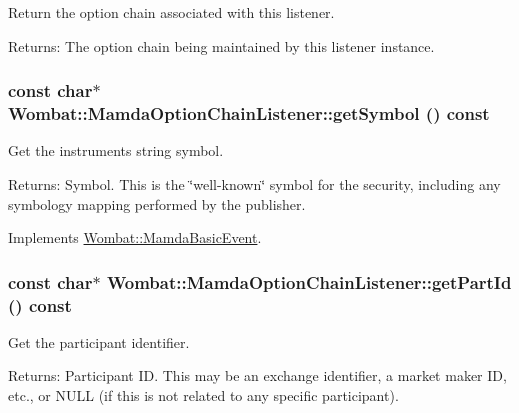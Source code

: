 Return the option chain associated with this listener. 

\begin{Desc}
\item[Returns:]The option chain being maintained by this listener instance. \end{Desc}
\hypertarget{classWombat_1_1MamdaOptionChainListener_74e03d49241666a1670a07e4187bf955}{
\subsubsection[getSymbol]{\setlength{\rightskip}{0pt plus 5cm}const char$\ast$ Wombat::Mamda\-Option\-Chain\-Listener::get\-Symbol () const}}
\label{classWombat_1_1MamdaOptionChainListener_74e03d49241666a1670a07e4187bf955}


Get the instruments string symbol. 

\begin{Desc}
\item[Returns:]Symbol. This is the \char`\"{}well-known\char`\"{} symbol for the security, including any symbology mapping performed by the publisher. \end{Desc}


Implements \hyperlink{classWombat_1_1MamdaBasicEvent_8783b136a1305d21c578ced8618c090b}{Wombat::Mamda\-Basic\-Event}.\hypertarget{classWombat_1_1MamdaOptionChainListener_742fc512426cd4b38cdddc67747ea269}{
\subsubsection[getPartId]{\setlength{\rightskip}{0pt plus 5cm}const char$\ast$ Wombat::Mamda\-Option\-Chain\-Listener::get\-Part\-Id () const}}
\label{classWombat_1_1MamdaOptionChainListener_742fc512426cd4b38cdddc67747ea269}


Get the participant identifier. 

\begin{Desc}
\item[Returns:]Participant ID. This may be an exchange identifier, a market maker ID, etc., or NULL (if this is not related to any specific participant). \end{Desc}


